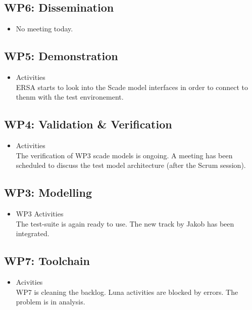 \documentclass[a4paper, 11pt]{article}
\begin{document}
\subsection{WP6: Dissemination}
\begin{itemize}

\item No meeting today.
\end{itemize}

\subsection{WP5: Demonstration}

\begin{itemize}
\item Activities\\
ERSA starts to look into the Scade model interfaces in order to connect to thenm with the test environement.

\end{itemize}

\subsection{WP4: Validation \& Verification}
\begin{itemize}
\item Activities\\
The verification of WP3 scade models is ongoing. A meeting has been scheduled to discuss the test model architecture (after the Scrum session).

\end{itemize}

\subsection{WP3: Modelling}

\begin{itemize}
\item WP3 Activities\\
The test-suite is again ready to use. The new track by Jakob has been integrated. 

\end{itemize}

\subsection{WP7: Toolchain}

\begin{itemize}
\item Acivities\\
WP7 is cleaning the backlog.
Luna activities are blocked by errors. The problem is in analysis.
\end{itemize}
\end{document}

